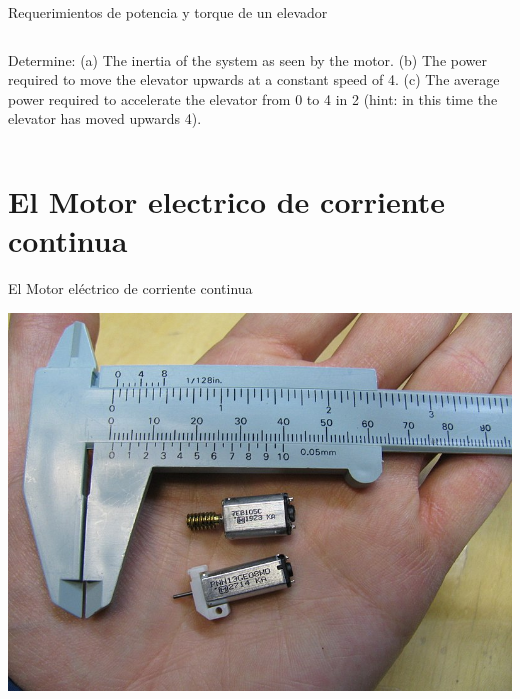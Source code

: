 \documentclass[presentation,aspectratio=169]{beamer}
\begin{document}
\begin{frame}[label={sec:org8a9e0af}]{Requerimientos de potencia y torque de un elevador}
\begin{columns}
\begin{column}{0.72\columnwidth}
Determine: \alert{(a)} The inertia of the system as seen by the motor. \alert{(b)} The power required to move the elevator upwards at a constant speed of \unit{4}{\meter\per\second}. \alert{(c)} The average power required to accelerate the elevator from 0 to \unit{4}{\meter\per\second} in \unit{2}{\second} (hint: in this time the elevator has moved upwards \unit{4}{\meter}).
\end{column}
\end{columns}
\end{frame}


\section{El Motor electrico de corriente continua}
\label{sec:orgf547358}
\begin{frame}[label={sec:orgeb455fe}]{El Motor eléctrico de corriente continua}
\begin{center}
\includegraphics[height=0.6\textheight]{../../figures/wiki-small-dc-motor.jpg}

\end{center}
\end{frame}
\end{document}
